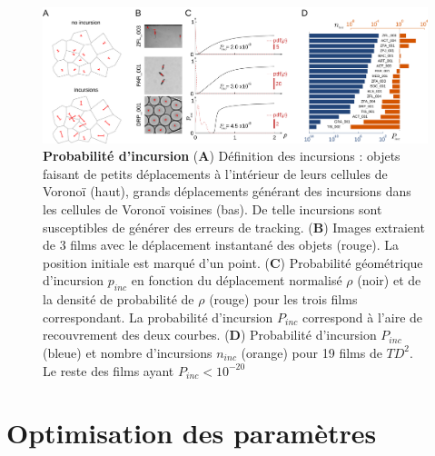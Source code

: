 	\begin{figure}[h]
    \centering
    \includegraphics[width=1\textwidth]{part_1/assets/Figure_3.png}    
    \caption{\textbf{Probabilité d'incursion} (\textbf{A}) Définition des incursions : objets faisant de petits déplacements à l'intérieur de leurs cellules de Voronoï (haut), grands déplacements générant des incursions dans les cellules de Voronoï voisines (bas). De telle incursions sont susceptibles de générer des erreurs de tracking. (\textbf{B}) Images extraient de 3 films avec le déplacement instantané des objets (rouge). La position initiale est marqué d'un point. (\textbf{C}) Probabilité géométrique d'incursion $p_{inc}$ en fonction du déplacement normalisé $\rho$ (noir) et de la densité de probabilité de $\rho$ (rouge) pour les trois films correspondant. La probabilité d'incursion $P_{inc}$ correspond à l'aire de recouvrement des deux courbes. (\textbf{D}) Probabilité d'incursion $P_{inc}$ (bleue) et nombre d'incursions $n_{inc}$ (orange) pour 19 films de $TD^2$. Le reste des films ayant $P_{inc}<10^{-20}$}
    \label{part_1:fig_3}
    \end{figure}
	
	\section{Optimisation des paramètres}
	
